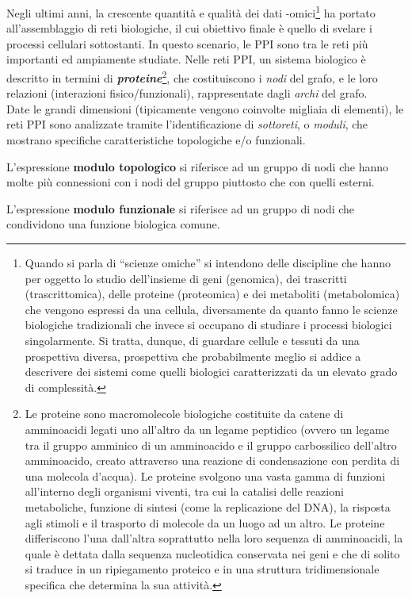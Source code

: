 \documentclass[11pt]{article}
\begin{document}
Negli ultimi anni, la crescente quantità e qualità dei dati -omici\footnote{Quando si parla di “scienze omiche” si intendono delle discipline che hanno per oggetto lo studio dell’insieme di geni (genomica), dei trascritti (trascrittomica), delle proteine (proteomica) e dei metaboliti (metabolomica) che vengono espressi da una cellula, diversamente da quanto fanno le scienze biologiche tradizionali che invece si occupano di studiare i processi biologici singolarmente. Si tratta, dunque, di guardare cellule e tessuti da una prospettiva diversa, prospettiva che probabilmente meglio si addice a descrivere dei sistemi come quelli biologici caratterizzati da un elevato grado di complessità.} ha portato all'assemblaggio di reti biologiche, il cui obiettivo finale è quello di svelare i processi cellulari sottostanti. In questo scenario, le PPI sono tra le reti più importanti ed ampiamente studiate. Nelle reti PPI, un sistema biologico è descritto in termini di \textit{\textbf{proteine}}\footnote{Le proteine sono macromolecole biologiche costituite da catene di amminoacidi legati uno all'altro da un legame peptidico (ovvero un legame tra il gruppo amminico di un amminoacido e il gruppo carbossilico dell'altro amminoacido, creato attraverso una reazione di condensazione con perdita di una molecola d'acqua). Le proteine svolgono una vasta gamma di funzioni all'interno degli organismi viventi, tra cui la catalisi delle reazioni metaboliche, funzione di sintesi (come la replicazione del DNA), la risposta agli stimoli e il trasporto di molecole da un luogo ad un altro. Le proteine differiscono l'una dall'altra soprattutto nella loro sequenza di amminoacidi, la quale è dettata dalla sequenza nucleotidica conservata nei geni e che di solito si traduce in un ripiegamento proteico e in una struttura tridimensionale specifica che determina la sua attività.}, 
che costituiscono i \textit{nodi} del grafo, e le loro relazioni (interazioni fisico/funzionali), rappresentate dagli \textit{archi} del grafo.\\

Date le grandi dimensioni (tipicamente vengono coinvolte migliaia di elementi), le reti PPI sono analizzate tramite l'identificazione di \textit{sottoreti}, o \textit{moduli}, che mostrano specifiche caratteristiche topologiche e/o funzionali.

L'espressione \textbf{modulo topologico} si riferisce ad un gruppo di nodi che hanno molte più connessioni con i nodi del gruppo piuttosto che con quelli esterni. 

L'espressione \textbf{modulo funzionale} si riferisce ad un gruppo di nodi che condividono una funzione biologica comune. 
\end{document}

